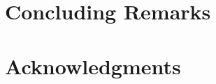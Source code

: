 \documentclass[11pt,relax]{SANDreport}
\begin{document}
\section{Concluding Remarks}

\section*{Acknowledgments}




\end{document}
